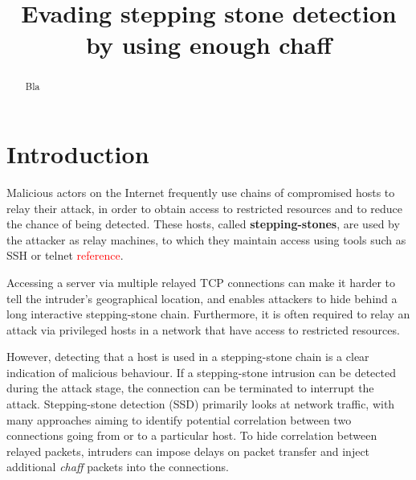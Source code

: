 \documentclass[runningheads]{llncs}\usepackage[]{graphicx}\usepackage[]{color}
\begin{document}
\title{Evading stepping stone detection by using enough chaff}



\maketitle          

\begin{abstract}

Bla
\end{abstract}



\section{Introduction}



Malicious actors on the Internet frequently use chains of compromised hosts to relay their attack, in order to obtain access to restricted resources and to reduce the chance of being detected. These hosts, called \textbf{stepping-stones}, are used by the attacker as relay machines, to which they maintain access using tools such as SSH or telnet \textcolor{red}{reference}. 

Accessing a server via multiple relayed TCP connections can make it harder to tell the intruder's geographical location, and enables attackers to hide behind a long interactive stepping-stone chain. Furthermore, it is often required to relay an attack via privileged hosts in a network that have access to restricted resources. 

However, detecting that a host is used in a stepping-stone chain is a clear indication of malicious behaviour. If a stepping-stone intrusion can be detected during the attack stage, the connection can be terminated to interrupt the attack. Stepping-stone detection (SSD) primarily looks at network traffic, with many approaches aiming to identify potential correlation between two connections going from or to a particular host. To hide correlation between relayed packets, intruders can impose delays on packet transfer and inject additional \textit{chaff} packets into the connections.
\end{document}
